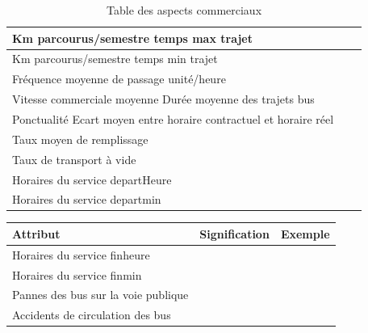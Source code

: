 \documentclass[a4paper]{report}
\begin{document}
\begin{doublespace}
\begin{table}[H]
\begin{center}
\begin{tabularx}{17.5cm}{|X|p{3cm}|p{1.5cm}|}
				\hline
				Km parcourus/semestre temps max trajet                            &                        &                  \\
				\hline
				Km parcourus/semestre temps min trajet                            &                        &                  \\
				\hline
				Fréquence moyenne de passage unité/heure                          &                        &                  \\
				\hline
				Vitesse commerciale moyenne Durée moyenne des trajets bus         &                        &                  \\
				\hline
				Ponctualité Ecart moyen entre horaire contractuel et horaire réel &                        &                  \\
				\hline
				Taux moyen de remplissage                                         &                        &                  \\
				\hline
				Taux de transport à vide                                          &                        &                  \\
				\hline
				Horaires du service departHeure                                   &                        &                  \\
				\hline
				Horaires du service departmin                                     &                        &                  \\
				\hline
			\end{tabularx}
			\caption{Table des aspects commerciaux}
		\end{center}
	\end{table}
	\begin{table}[H]
		\begin{center}
			\begin{tabularx}{17.5cm}{|X|p{3cm}|p{1.5cm}|}
				\hline
				\textbf{Attribut}                               & \textbf{Signification} & \textbf{Exemple} \\
				\hline
				Horaires du service finheure                    &                        &                  \\
				\hline
				Horaires du service finmin                      &                        &                  \\
				\hline
				Pannes des bus sur la voie publique             &                        &                  \\
				\hline
				Accidents de circulation des bus                &                        &                  \\

\end{tabularx}
\end{center}
\end{table}
\end{doublespace}
\end{document}

